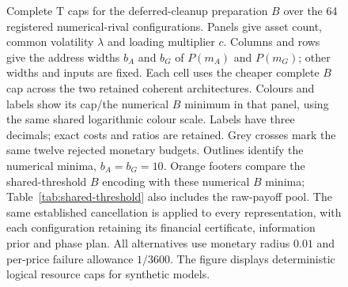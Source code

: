 \begin{figure}[!htb]
\caption{Complete T caps for the deferred-cleanup preparation $B$ over the 64 registered numerical-rival configurations. Panels give asset count, common volatility $\lambda$ and loading multiplier $c$. Columns and rows give the address widths $b_A$ and $b_G$ of $P(m_A)$ and $P(m_G)$; other widths and inputs are fixed. Each cell uses the cheaper complete $B$ cap across the two retained coherent architectures. Colours and labels show its cap/the numerical $B$ minimum in that panel, using the same shared logarithmic colour scale. Labels have three decimals; exact costs and ratios are retained. Grey crosses mark the same twelve rejected monetary budgets. Outlines identify the numerical minima, $b_A=b_G=10$. Orange footers compare the shared-threshold $B$ encoding with these numerical $B$ minima; Table~\ref{tab:shared-threshold} also includes the raw-payoff pool. The same established cancellation is applied to every representation, with each configuration retaining its financial certificate, information prior and phase plan. All alternatives use monetary radius $0.01$ and per-price failure allowance $1/3600$. The figure displays deterministic logical resource caps for synthetic models.}
\label{fig:pricing-precision}
\end{figure}
